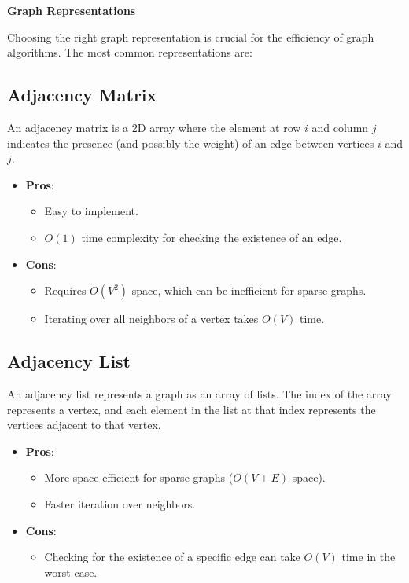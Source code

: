 \textbf{Graph Representations}

Choosing the right graph representation is crucial for the efficiency of graph algorithms. The most common representations are:

\subsection{Adjacency Matrix}

An adjacency matrix is a 2D array where the element at row \( i \) and column \( j \) indicates the presence (and possibly the weight) of an edge between vertices \( i \) and \( j \).

\begin{itemize}
    \item \textbf{Pros}:
    \begin{itemize}
        \item Easy to implement.
        \item \( O(1) \) time complexity for checking the existence of an edge.
    \end{itemize}
    \item \textbf{Cons}:
    \begin{itemize}
        \item Requires \( O(V^2) \) space, which can be inefficient for sparse graphs.
        \item Iterating over all neighbors of a vertex takes \( O(V) \) time.
    \end{itemize}
\end{itemize}

\subsection{Adjacency List}

An adjacency list represents a graph as an array of lists. The index of the array represents a vertex, and each element in the list at that index represents the vertices adjacent to that vertex.

\begin{itemize}
    \item \textbf{Pros}:
    \begin{itemize}
        \item More space-efficient for sparse graphs (\( O(V + E) \) space).
        \item Faster iteration over neighbors.
    \end{itemize}
    \item \textbf{Cons}:
    \begin{itemize}
        \item Checking for the existence of a specific edge can take \( O(V) \) time in the worst case.
    \end{itemize}
\end{itemize}

